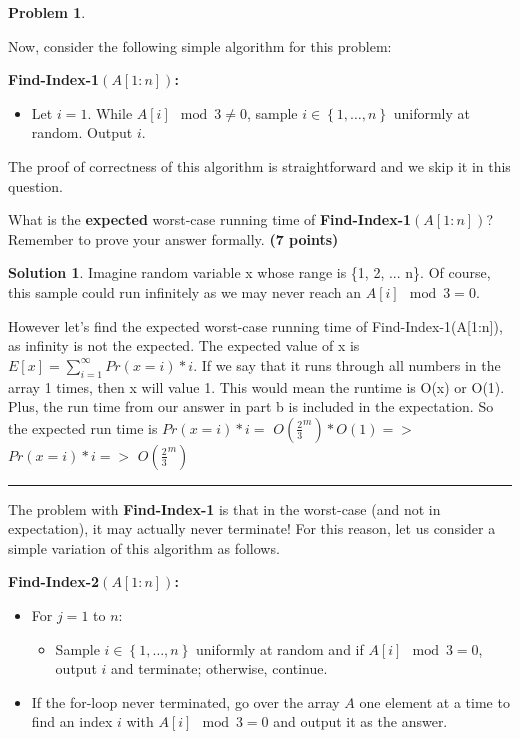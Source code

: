 \documentclass{article}
\theoremstyle{definition}
\newtheorem{problem}{Problem}
\def\fline{\rule{0.75\linewidth}{0.5pt}}
\newcommand{\finishline}{\begin{center}\fline\end{center}}
\newtheorem*{solution*}{Solution}
\newenvironment{solution}{\begin{solution*}}{{\finishline} \end{solution*}}
\newcommand{\grade}[1]{\hfill{\textbf{($\mathbf{#1}$ points)}}}
\newcommand{\set}[1]{\ensuremath{\left\{ #1 \right\}}}
\begin{document}
\begin{problem}
\begin{enumerate}
\end{enumerate}

Now, consider the following simple algorithm for this problem: 


\textbf{Find-Index-1$(A[1:n])$:} 
\begin{itemize}
	\item Let $i=1$.  While $A[i] \mod 3 \neq 0$, sample $i \in \set{1,\ldots,n}$ uniformly at random. Output $i$. 
\end{itemize}

The proof of correctness of this algorithm is straightforward and we skip it in this question. 

\begin{enumerate}
\item[(c)] What is the \textbf{expected} worst-case running time of \textbf{Find-Index-1$(A[1:n])$}? Remember to prove your answer formally. \grade{7} 


	\begin{solution}
		\item Imagine random variable x whose range is \{1, 2, ... n\}.  Of course, this sample could run infinitely as we may never reach an $A[i] \mod 3 = 0$.
		\item However let's find the expected worst-case running time of Find-Index-1(A[1:n]), as infinity is not the expected.  The expected value of x is $E[x] = \sum_{i = 1}^{\infty}Pr(x = i) * i$. If we say that it runs through all numbers in the array 1 times, then x will value 1. This would mean the runtime is O(x) or O(1). Plus, the run time from our answer in part b is included in the expectation. So the expected run time is $Pr(x = i) * i  =$ $O({\frac{2}{3}}^m) * O(1) =>$ $Pr(x = i) * i =>$ $O({\frac{2}{3}}^m)$
		\item 
	\end{solution}
	
\end{enumerate}

The problem with \textbf{Find-Index-1} is that in the worst-case (and not in expectation), it may actually never terminate! For this reason, let us consider 
a simple variation of this algorithm as follows. 

\textbf{Find-Index-2$(A[1:n])$:} 
\begin{itemize}
	\item For $j=1$ to $n$: 
	\begin{itemize}
		\item Sample $i \in \set{1,\ldots,n}$ uniformly at random and if $A[i] \mod 3 = 0$, output $i$ and terminate; otherwise, continue. 
	\end{itemize}
	\item If the for-loop never terminated, go over the array $A$ one element at a time to find an index $i$ with $A[i] \mod 3 = 0$ and output it as the answer. 
\end{itemize}


\end{problem}
\end{document}
